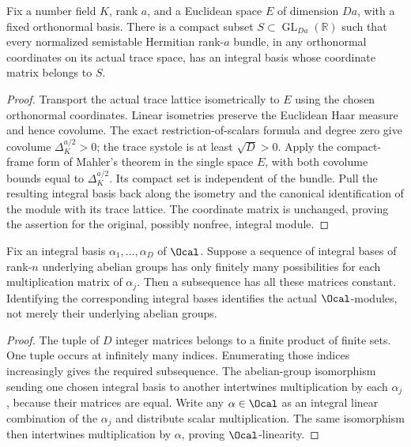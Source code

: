 \begin{lemma}
\label{lem:compact-trace-frames}
\leanok
{}
Fix a number field $K$, rank $a$, and a Euclidean space $E$ of dimension
$Da$, with a fixed orthonormal basis. There is a compact subset
$S\subset\operatorname{GL}_{Da}(\mathbb R)$ such that every normalized
semistable Hermitian rank-$a$ bundle, in any orthonormal coordinates on
its actual trace space, has an integral basis whose coordinate matrix
belongs to $S$.
\end{lemma}
\begin{proof}
Transport the actual trace lattice isometrically to $E$ using the chosen
orthonormal coordinates. Linear isometries preserve the Euclidean Haar
measure and hence covolume. The exact restriction-of-scalars formula and
degree zero give covolume $\Delta_K^{a/2}>0$; the trace systole is at
least $\sqrt D>0$. Apply the compact-frame form of Mahler's theorem in
the single space $E$, with both covolume bounds equal to
$\Delta_K^{a/2}$. Its compact set is independent of the bundle.
Pull the resulting integral basis back along the isometry and the
canonical identification of the module with its trace lattice.
The coordinate matrix is unchanged, proving the assertion for the
original, possibly nonfree, integral module.
\end{proof}

\begin{lemma}
\label{lem:fixed-integral-action}
\leanok
{}
Fix an integral basis $\alpha_1,\ldots,\alpha_D$ of $\Ocal$.
Suppose a sequence of integral bases of rank-$n$ underlying abelian
groups has only finitely many possibilities for each multiplication
matrix of $\alpha_j$. Then a subsequence has all these matrices constant.
Identifying the corresponding integral bases identifies the actual
$\Ocal$-modules, not merely their underlying abelian groups.
\end{lemma}
\begin{proof}
The tuple of $D$ integer matrices belongs to a finite product of finite
sets. One tuple occurs at infinitely many indices. Enumerating those
indices increasingly gives the required subsequence. The abelian-group
isomorphism sending one chosen integral basis to another intertwines
multiplication by each $\alpha_j$, because their matrices are equal.
Write any $\alpha\in\Ocal$ as an integral linear combination of the
$\alpha_j$ and distribute scalar multiplication. The same isomorphism
then intertwines multiplication by $\alpha$, proving $\Ocal$-linearity.
\end{proof}

